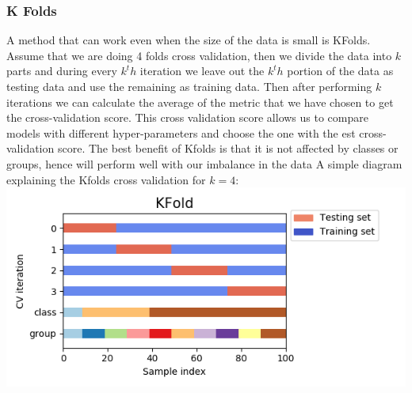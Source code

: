 \documentclass[11pt]{article}
\makeatletter
\def\maxwidth{\ifdim\Gin@nat@width>\linewidth\linewidth
    \else\Gin@nat@width\fi}
\let\Oldincludegraphics\includegraphics
\renewcommand{\includegraphics}[1]{\Oldincludegraphics[width=.8\maxwidth]{#1}}
\makeatother
\begin{document}
\hypertarget{k-folds}{%
\subsubsection{K Folds}\label{k-folds}}

A method that can work even when the size of the data is small is
KFolds. Assume that we are doing 4 folds cross validation, then we
divide the data into \(k\) parts and during every \(k^th\) iteration we
leave out the \(k^th\) portion of the data as testing data and use the
remaining as training data. Then after performing \(k\) iterations we
can calculate the average of the metric that we have chosen to get the
cross-validation score. This cross validation score allows us to compare
models with different hyper-parameters and choose the one with the est
cross-validation score. The best benefit of Kfolds is that it is not
affected by classes or groups, hence will perform well with our
imbalance in the data A simple diagram explaining the Kfolds cross
validation for \(k=4\): \includegraphics{img/kfolds.png}
\end{document}
